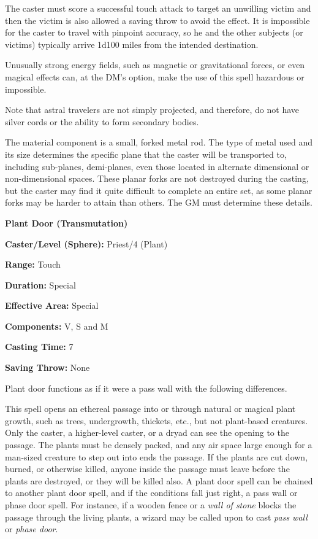 \begin{multicols}{2}
The caster must score a successful touch attack to target an unwilling victim and then the victim is also allowed a saving throw to avoid the effect.  It is impossible for the caster to travel with pinpoint accuracy, so he and the other subjects (or victims) typically arrive 1d100 miles from the intended destination.

Unusually strong energy fields, such as magnetic or gravitational forces, or even magical effects can, at the DM's option, make the use of this spell hazardous or impossible.

Note that astral travelers are not simply projected, and therefore, do not have silver cords or the ability to form secondary bodies.

The material component is a small, forked metal rod. The type of metal used and its size determines the specific plane that the caster will be transported to, including sub-planes, demi-planes, even those located in alternate dimensional or non-dimensional spaces.  These planar forks are not destroyed during the casting, but the caster may find it quite difficult to complete an entire set, as some planar forks may be harder to attain than others.  The GM must determine these details.  

\vspace{1em}

\noindent
\begin{minipage}{\columnwidth}

\noindent \textbf{Plant Door (Transmutation)}

\noindent \textbf{Caster/Level (Sphere):} Priest/4 (Plant)

\noindent \textbf{Range:} Touch

\noindent \textbf{Duration:} Special

\noindent \textbf{Effective Area:} Special

\noindent \textbf{Components:} V, S and M

\noindent \textbf{Casting Time:} 7

\noindent \textbf{Saving Throw:} None

\end{minipage}

Plant door functions as if it were a pass wall with the following differences.  

This spell opens an ethereal passage into or through natural or magical plant growth, such as trees, undergrowth, thickets, etc., but not plant-based creatures.  Only the caster, a higher-level caster, or a dryad can see the opening to the passage. The plants must be densely packed, and any air space large enough for a man-sized creature to step out into ends the passage.  If the plants are cut down, burned, or otherwise killed, anyone inside the passage must leave before the plants are destroyed, or they will be killed also.  A plant door spell can be chained to another plant door spell, and if the conditions fall just right, a pass wall or phase door spell.  For instance, if a wooden fence or a \textit{wall of stone} blocks the passage through the living plants, a wizard may be called upon to cast \textit{pass wall} or \textit{phase door}.


\end{multicols}
